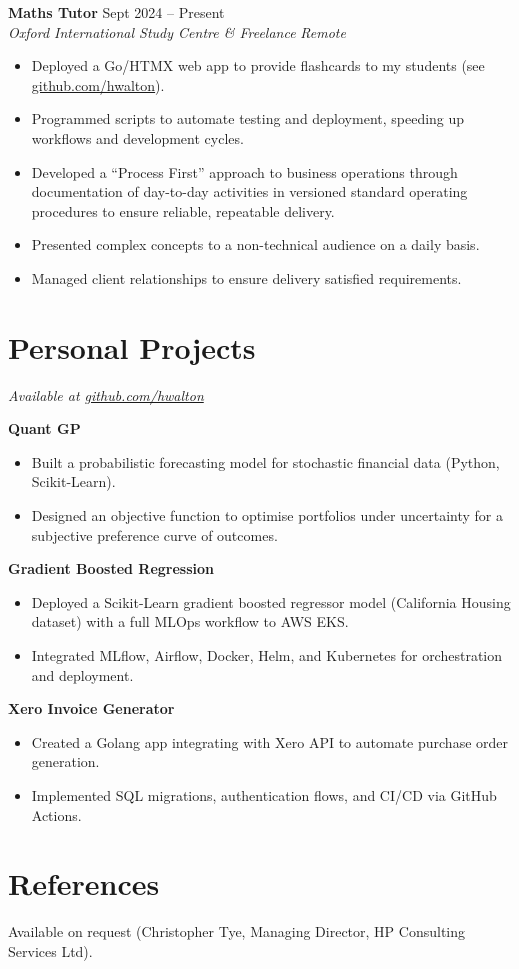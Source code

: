 \documentclass[a4paper,10pt]{article}
\newcommand{\resumeSubheading}[4]{
  \vspace{1pt}\textbf{#1} \hfill #2 \\
  \textit{#3} \hfill \textit{#4}
}
\newcommand{\resumeItem}[1]{\item{#1}}
\newcommand{\resumeItemListStart}{\begin{itemize}[leftmargin=*,itemsep=0pt,parsep=0pt]}
\newcommand{\resumeItemListEnd}{\end{itemize}\vspace{-3pt}}
\begin{document}
\resumeSubheading{Maths Tutor}{Sept 2024 -- Present}{Oxford International Study Centre \& Freelance}{Remote}
\resumeItemListStart
\resumeItem{Deployed a Go/HTMX web app to provide flashcards to my students (see \href{https://github.com/hwalton/flashcard-app-showcase}{github.com/hwalton}).}
\resumeItem{Programmed scripts to automate testing and deployment, speeding up workflows and development cycles.}
\resumeItem{Developed a ``Process First'' approach to business operations through documentation of day-to-day activities in versioned standard operating procedures to ensure reliable, repeatable delivery.}
\resumeItem{Presented complex concepts to a non-technical audience on a daily basis.}
\resumeItem{Managed client relationships to ensure delivery satisfied requirements.}
\resumeItemListEnd


\section{Personal Projects}
\hfill\textit{Available at \href{https://github.com/hwalton}{github.com/hwalton}}

\textbf{Quant GP}
\resumeItemListStart
  \resumeItem{Built a probabilistic forecasting model for stochastic financial data (Python, Scikit-Learn).}
  \resumeItem{Designed an objective function to optimise portfolios under uncertainty for a subjective preference curve of outcomes.}
\resumeItemListEnd

\textbf{Gradient Boosted Regression}
\resumeItemListStart
  \resumeItem{Deployed a Scikit-Learn gradient boosted regressor model (California Housing dataset) with a full MLOps workflow to AWS EKS.}
  \resumeItem{Integrated MLflow, Airflow, Docker, Helm, and Kubernetes for orchestration and deployment.}
\resumeItemListEnd

\textbf{Xero Invoice Generator}
\resumeItemListStart
  \resumeItem{Created a Golang app integrating with Xero API to automate purchase order generation.}
  \resumeItem{Implemented SQL migrations, authentication flows, and CI/CD via GitHub Actions.}
\resumeItemListEnd

\section{References}
Available on request (Christopher Tye, Managing Director, HP Consulting Services Ltd).
\end{document}
